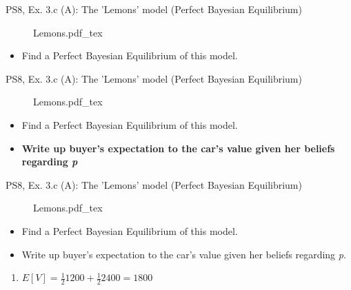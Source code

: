 \begin{frame}{PS8, Ex. 3.c (A): The 'Lemons' model (Perfect Bayesian Equilibrium)}
    \begin{figure}[!h]
      \center {}
      {Lemons.pdf_tex}
    \end{figure}
    \vspace{-8pt}
    \begin{itemize}
      \item[(c)] Find a Perfect Bayesian Equilibrium of this model.
    \end{itemize}
    \vfill\null
\end{frame}
\begin{frame}{PS8, Ex. 3.c (A): The 'Lemons' model (Perfect Bayesian Equilibrium)}
    \begin{figure}[!h]
      \center {}
      {Lemons.pdf_tex}
    \end{figure}
    \vspace{-8pt}
    \begin{itemize}
      \item[(c)] Find a Perfect Bayesian Equilibrium of this model.
    \end{itemize}
    \vspace{-8pt}
    \begin{multicols}{2}
      \begin{itemize}
        \item[Step 1:] \textbf{Write up buyer's expectation to the car's value given her beliefs regarding \textit{p}}
      \end{itemize}
      \vfill\null\columnbreak
      \vfill\null
    \end{multicols}
\end{frame}
\begin{frame}{PS8, Ex. 3.c (A): The 'Lemons' model (Perfect Bayesian Equilibrium)}
    \begin{figure}[!h]
      \center {}
      {Lemons.pdf_tex}
    \end{figure}
    \vspace{-8pt}
    \begin{itemize}
      \item[(c)] Find a Perfect Bayesian Equilibrium of this model.
    \end{itemize}
    \vspace{-8pt}
    \begin{multicols}{2}
      \begin{itemize}
        \item[Step 1:] Write up buyer's expectation to the car's value given her beliefs regarding \textit{p}.
      \end{itemize}
      \vfill\null\columnbreak
      \begin{enumerate}
        \item $E[V]=\frac{1}{2}1200+\frac{1}{2}2400=1800$
      \end{enumerate}
      \vfill\null
    \end{multicols}
\end{frame}
